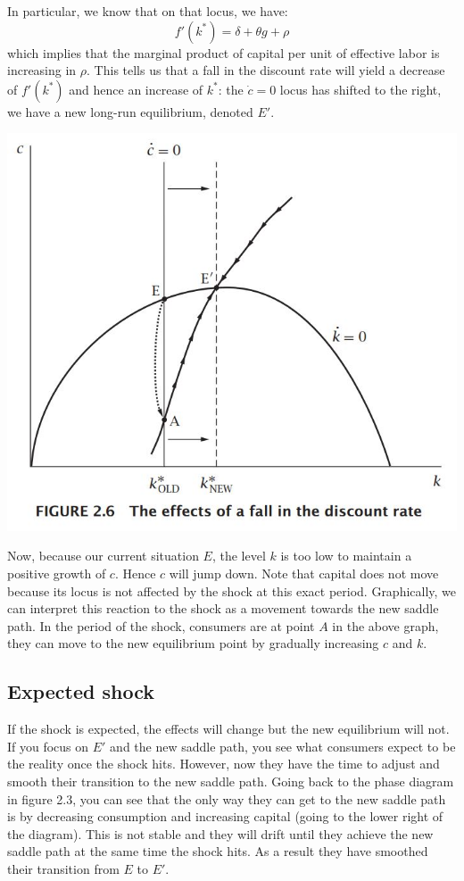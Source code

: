 \documentclass[12pt]{report}
\begin{document}
In particular, we know that on that locus, we have: $$f'(k^*) = \delta + \theta g + \rho $$ which implies that the marginal product of capital per unit of effective labor is increasing in $\rho$. This tells us that a fall in the discount rate will yield a decrease of $f'(k^*)$ and hence an increase of $k^*$: the $\dot c = 0$ locus has shifted to the right, we have a new long-run equilibrium, denoted $E'$.\begin{center}
\includegraphics[scale=0.55]{images/Ramseysavingshock}
\end{center}

Now, because our current situation $E$, the level $k$ is too low to maintain a positive growth of $c$. Hence $c$ will jump down. Note that capital does not move because its locus is not affected by the shock at this exact period. Graphically, we can interpret this reaction to the shock as a movement towards the new saddle path. In the period of the shock, consumers are at point $A$ in the above graph, they can move to the new equilibrium point by gradually increasing $c$ and $k$.

\subsection{Expected shock}

If the shock is expected, the effects will change but the new equilibrium will not. If you focus on $E'$ and the new saddle path, you see what consumers expect to be the reality once the shock hits. However, now they have the time to adjust and smooth their transition to the new saddle path. Going back to the phase diagram in figure 2.3, you can see that the only way they can get to the new saddle path is by decreasing consumption and increasing capital (going to the lower right of the diagram). This is not stable and they will drift until they achieve the new saddle path at the same time the shock hits. As a result they have smoothed their transition from $E$ to $E'$.
\end{document}
